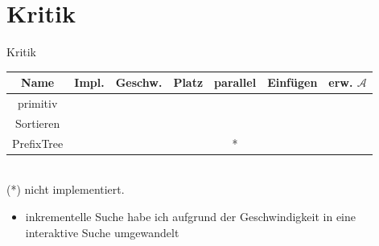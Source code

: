 \documentclass[11pt, xcolor=dvipsnames]{beamer}
\begin{document}
	\section{Kritik}
	\begin{frame}{Kritik}
		\centering
		\begin{tabular}{c|cccccc}
			\textbf{Name}	&  Impl. & Geschw. & Platz & parallel & Einfügen & erw. $\mathcal{A}$ \\ 
			\hline
			primitiv	& \cellcolor{green} & \cellcolor{orange}  & \cellcolor{green}& \cellcolor{green} & \cellcolor{green} & \cellcolor{green} \\ 
			Sortieren	& \cellcolor{yellow} & \cellcolor{green} & \cellcolor{yellow} & \cellcolor{yellow} & \cellcolor{yellow} & \cellcolor{green} \\
			PrefixTree & \cellcolor{orange}  & \cellcolor{red} & \cellcolor{red} &\cellcolor{orange} * & \cellcolor{green} & \cellcolor{yellow}
		\end{tabular}\\
		(*) nicht implementiert. 
		
		\begin{itemize}
			\item inkrementelle Suche habe ich aufgrund der Geschwindigkeit in eine interaktive Suche umgewandelt
		\end{itemize}
	\end{frame}
\end{document}
